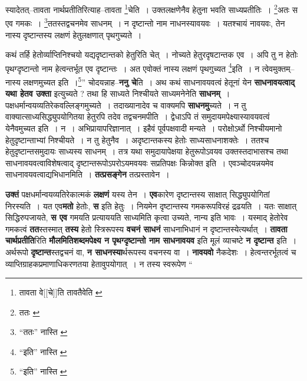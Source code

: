 \documentclass[article,12pt,a4paper]{memoir}
\begin{document}
	स्यादेतत्--तावता नार्थप्रतीतिरित्याह--तावता \footnote{तावता वे[[चे]]ति \cite{dp-msC} तावतैवेति \cite{dp-msB} \cite{dp-msD} \cite{dp-edP} \cite{dp-edH} \cite{dp-edE} \cite{dp-edN}}चेति । उक्तलक्षणेनैव हेतुना भवति साध्यप्रतीतिः । \footnote{ततः \cite{dp-msB}}अतः स एव गमकः । \footnote{“ततः” नास्ति \cite{dp-msA} \cite{dp-edP} \cite{dp-edH}}ततस्तद्वचनमेव साधनम् । न दृष्टान्तो नाम नाधनस्यावयवः । यतश्चायं नावयवः, तेन नास्य दृष्टान्तस्य लक्षणं हेतुलक्षणात् पृथगुच्यते । 
	  
	कथं तर्हि हेतोर्व्याप्तिनिश्चयो यद्यदृष्टान्तको हेतुरिति चेत् । नोच्यते हेतुरदृषटान्तक एव । अपि तु न हेतोः पृथग्दृष्टान्तो नाम हेत्वन्तर्भूत एव दृष्टान्तः । अत एवोक्तं नास्य लक्षणं पृथगुच्यत \footnote{“इति” नास्ति \cite{dp-msB} \cite{dp-msD}}इति । न त्वेवमुक्तम्--नास्य लक्षणमुच्यत इति ।\footnote{“इति” नास्ति \cite{dp-msB}}” चोदयन्नाह--\textbf{ननु चे}ति । अथ कथं साधनावयवत्वं हेतूनां येन \textbf{साधनावयत्वाद् यथा हेतव उक्ता} इत्युच्यते ? तथा हि साध्यते निश्चीयते साध्यमनेनेति \textbf{साधनम्} । पक्षधर्मान्वयव्यतिरेकवल्लिङ्गमुच्यते । तदाख्यानादेव च वाक्यमपि \textbf{साधनमु}च्यते । न तु वाक्यात्साध्यसिद्ध्युपयोगितया हेतुरपि तदेव तद्वचनमपीति । द्वेधाऽपि तं समुदायमपेक्ष्यास्यावयवत्वं येनैवमुच्यत इति । न । अभिप्रायापरिज्ञानात् । इहैवं पूर्वपक्षवादी मन्यते । परोक्षोऽर्थो निश्चीयमानो हेतुदृष्टान्ताभ्यां निश्चीयते । न तु हेतुनैव । अदृष्टान्तकस्य हेतोः साध्यसाधनाशक्तेः । ततश्च हेतुदृष्टान्तसमुदायः साध्यस्य साधनम् । तत्र यथा समुदायापेक्षया हेतुरूपोऽवयव उक्तस्तदाभासश्च तथा साधनावयवत्वाविशेषत्वाद् दृष्टान्तरूपोऽपरोऽयमवयवः सप्रतिपक्षः किन्नोक्त इति । एवञ्चोदयन्नयमेव साधनावयवत्वाद्यभिधानमिति । \textbf{तत्प्रसङ्गेन} तत्प्रस्तावेन ।
	\pend
      

	  \pstart \textbf{उक्तं} पक्षधर्मान्वयव्यतिरेकात्मकं \textbf{लक्षणं} यस्य तेन । \textbf{एव}कारेण दृष्टान्तस्य साक्षात् सिद्ध्युपयोगितां निरस्यति । यत एव\textbf{मतो} हेतोः, \textbf{स} इति हेतुः । नियमेन दृष्टान्तस्य गमकरूपविरहं द्रढयति । यतः साक्षात् सिद्धिरुपजायते, \textbf{स एव} गमयति प्रत्याययति साध्यमिति कृत्वा उच्यते, नान्य इति भावः । यस्माद् हेतोरेव गमकत्वं \textbf{तत}स्तस्मात् \textbf{तस्य} हेतो स्त्रिरूपस्य \textbf{वचनं साधनं} साधनाभिधानं न दृष्टान्तस्येत्यर्थात् । \textbf{तावता चार्थप्रतीति}रिति \textbf{मौलमितिशब्दमपेक्ष्य न पृथग्दृष्टान्तो नाम साधनावयव} इति मूलं व्याचष्टे \textbf{न दृष्टान्त} इति । अर्थरूपो \textbf{दृष्टान्त}स्तद्वचनं वा, \textbf{न साधनस्या}र्थरूपस्य वचनस्य वा । \textbf{नावयवो} नैकदेशः । हेत्वन्तरर्भूतत्वं च व्याप्तिग्राहकप्रमाणाधिकरणतया हेतावुपयोगात् । न तस्य स्वरू\leavevmode{}पेण  \leavevmode{} “
	  
\end{document}
